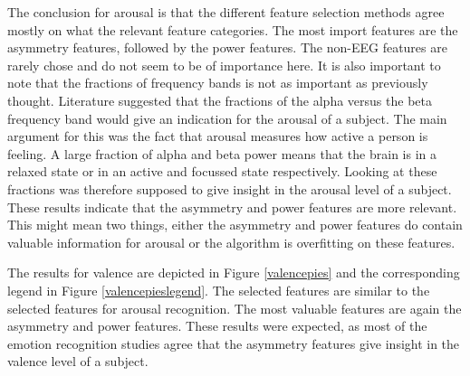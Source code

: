 The conclusion for arousal is that the different feature selection methods agree mostly on what the relevant feature categories. The most import features are the asymmetry features, followed by the power features. The non-EEG features are rarely chose and do not seem to be of importance here. It is also important to note that the fractions of frequency bands is not as important as previously thought. Literature suggested that the fractions of the alpha versus the beta frequency band would give an indication for the arousal of a subject. The main argument for this was the fact that arousal measures how active a person is feeling. A large fraction of alpha and beta power means that the brain is in a relaxed state or in an active and focussed state respectively. Looking at these fractions was therefore supposed to give insight in the arousal level of a subject. These results indicate that the asymmetry and power features are more relevant. This might mean two things, either the asymmetry and power features do contain valuable information for arousal or the algorithm is overfitting on these features.

\npar

The results for valence are depicted in Figure \ref{valencepies} and the corresponding legend in Figure \ref{valencepieslegend}. The selected features are similar to the selected features for arousal recognition. The most valuable features are again the asymmetry and power features. These results were expected, as most of the emotion recognition studies agree that the asymmetry features give insight in the valence level of a subject.

